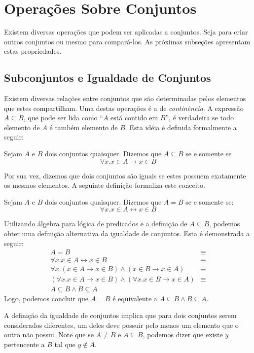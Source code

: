 \section{Operações Sobre Conjuntos}

Existem diversas operações que podem ser aplicadas a conjuntos. Seja
para criar outros conjuntos ou mesmo para compará-los. As próximas
subseções apresentam estas propriedades.

\subsection{Subconjuntos e Igualdade de Conjuntos}

Existem diversas relações entre conjuntos que são determinadas pelos
elementos que estes compartilham. Uma destas operações é a de
\emph{continência}. A expressão $A\subseteq B$, que  pode ser lida
como ``$A$ está contido em $B$'', é verdadeira se todo elemento de $A$
é também elemento de $B$. Esta idéia é definida formalmente a seguir:
\begin{Definition}[Continência]
Sejam $A$ e $B$ dois conjuntos quaisquer. Dizemos que $A \subseteq B$
se e somente se
\[\forall x. x\in A \to x \in B\]
\end{Definition}

Por sua vez, dizemos que dois conjuntos são iguais se estes possuem
exatamente os mesmos elementos. A seguinte definição formaliza este
conceito.

\begin{Definition}[Igualdade]
Sejam $A$ e $B$ dois conjuntos quaisquer. Dizemos que $A = B$ se e
somente se:
\[
\forall x. x\in A \leftrightarrow x \in B
\]
\end{Definition}
Utilizando álgebra para lógica de predicados e a definição de $A
\subseteq B$, podemos obter uma definição alternativa da igualdade de
conjuntos. Esta é demonstrada a seguir:
\[
\begin{array}{lc}
A = B & \equiv \\
\forall x. x \in A \leftrightarrow x \in B & \equiv\\
\forall x. (x\in A \to x \in B) \land (x \in B \to x \in A) & \equiv\\
(\forall x. x\in A \to x \in B) \land (\forall x . x\in B \to x \in A)
& \equiv\\
A\subseteq B\land B \subseteq A
\end{array}
\]
Logo, podemos concluir que $A = B$ é equivalente a $A \subseteq B
\land B\subseteq A$.

A definição da igualdade de conjuntos implica que  para dois conjuntos
serem considerados diferentes, um deles deve possuir pelo menos um
elemento que o outro não possui. Note que se $A \neq B$ e $A\subseteq
B$, podemos dizer que existe $y$ pertencente a $B$ tal que $y\not\in A$.